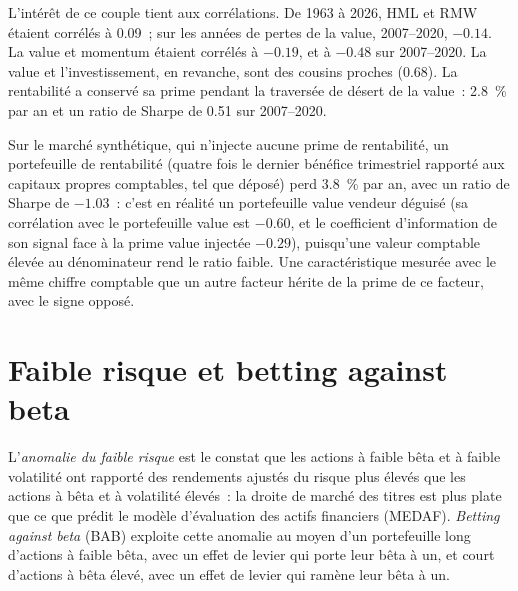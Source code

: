 L'intérêt de ce couple tient aux corrélations. De 1963 à 2026, HML et RMW étaient corrélés à 0.09~; sur les années de pertes de la value, 2007--2020, $-0.14$. La value et
momentum étaient corrélés à $-0.19$, et à $-0.48$ sur 2007--2020. La value et l'investissement, en revanche, sont des cousins proches (0.68). La rentabilité a conservé sa prime
pendant la traversée de désert de la value~: 2.8~\% par an et un ratio de Sharpe de 0.51 sur 2007--2020.

Sur le marché synthétique, qui n'injecte aucune prime de rentabilité, un portefeuille de rentabilité (quatre fois le dernier bénéfice trimestriel rapporté aux capitaux propres comptables, tel que déposé) perd
3.8~\% par an, avec un ratio de Sharpe de $-1.03$~: c'est en réalité un portefeuille value vendeur déguisé (sa corrélation avec le portefeuille value est $-0.60$, et le coefficient d'information de son signal face à la
prime value injectée $-0.29$), puisqu'une valeur comptable élevée au dénominateur rend le ratio faible. Une caractéristique mesurée avec le même chiffre comptable que
un autre facteur hérite de la prime de ce facteur, avec le signe opposé.

\section{Faible risque et betting against beta}

\begin{definition}\label{def:s1:value-quality-and-low-risk:bab}
L'\emph{anomalie du faible risque} est le constat que les actions à faible bêta et à faible volatilité ont rapporté des rendements ajustés du risque plus élevés que
les actions à bêta et à volatilité élevés~: la droite de marché des titres est plus plate que ce que prédit le modèle d'évaluation des actifs financiers (MEDAF). \emph{Betting against
beta} (BAB) exploite cette anomalie au moyen d'un portefeuille long d'actions à faible bêta, avec un effet de levier qui porte leur bêta à un, et court d'actions à bêta élevé, avec un effet de levier qui ramène leur bêta à
un.
\end{definition}

